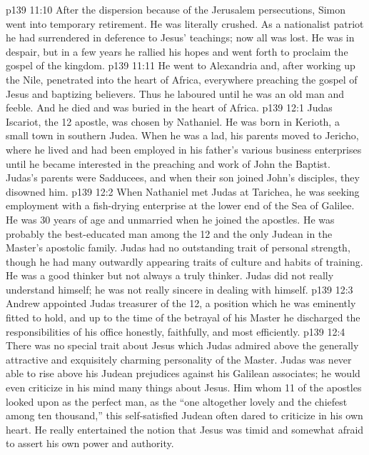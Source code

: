 \vs p139 11:10 \pc After the dispersion because of the Jerusalem persecutions, Simon went into temporary retirement. He was literally crushed. As a nationalist patriot he had surrendered in deference to Jesus’ teachings; now all was lost. He was in despair, but in a few years he rallied his hopes and went forth to proclaim the gospel of the kingdom.
\vs p139 11:11 He went to Alexandria and, after working up the Nile, penetrated into the heart of Africa, everywhere preaching the gospel of Jesus and baptizing believers. Thus he laboured until he was an old man and feeble. And he died and was buried in the heart of Africa.
\vs p139 12:1 Judas Iscariot, the 12 apostle, was chosen by Nathaniel. He was born in Kerioth, a small town in southern Judea. When he was a lad, his parents moved to Jericho, where he lived and had been employed in his father’s various business enterprises until he became interested in the preaching and work of John the Baptist. Judas’s parents were Sadducees, and when their son joined John’s disciples, they disowned him.
\vs p139 12:2 \pc When Nathaniel met Judas at Tarichea, he was seeking employment with a fish\hyp{}drying enterprise at the lower end of the Sea of Galilee. He was 30 years of age and unmarried when he joined the apostles. He was probably the best\hyp{}educated man among the 12 and the only Judean in the Master’s apostolic family. Judas had no outstanding trait of personal strength, though he had many outwardly appearing traits of culture and habits of training. He was a good thinker but not always a truly  thinker. Judas did not really understand himself; he was not really sincere in dealing with himself.
\vs p139 12:3 Andrew appointed Judas treasurer of the 12, a position which he was eminently fitted to hold, and up to the time of the betrayal of his Master he discharged the responsibilities of his office honestly, faithfully, and most efficiently.
\vs p139 12:4 \pc There was no special trait about Jesus which Judas admired above the generally attractive and exquisitely charming personality of the Master. Judas was never able to rise above his Judean prejudices against his Galilean associates; he would even criticize in his mind many things about Jesus. Him whom 11 of the apostles looked upon as the perfect man, as the “one altogether lovely and the chiefest among ten thousand,” this self\hyp{}satisfied Judean often dared to criticize in his own heart. He really entertained the notion that Jesus was timid and somewhat afraid to assert his own power and authority.
